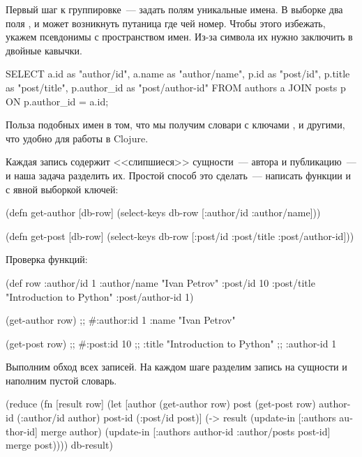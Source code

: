 Первый шаг к группировке~--- задать полям уникальные имена. В выборке два поля , и может возникнуть путаница где чей номер. Чтобы этого избежать, укажем псевдонимы с пространством имен. Из-за символа \code{/} их нужно заключить в двойные кавычки.

\begin{english}
  \begin{sql}
SELECT
  a.id        as "author/id",
  a.name      as "author/name",
  p.id        as "post/id",
  p.title     as "post/title",
  p.author_id as "post/author-id"
FROM authors a
JOIN posts p ON p.author_id = a.id;
  \end{sql}
\end{english}

Польза подобных имен в том, что мы получим словари с ключами ,  и другими, что удобно для работы в Clojure.

Каждая запись содержит <<слипшиеся>> сущности~--- автора и публикацию~--- и наша задача разделить их. Простой способ это сделать~--- написать функции  и  с явной выборкой ключей:

\begin{english}
  \begin{clojure}
(defn get-author [db-row]
  (select-keys db-row [:author/id :author/name]))

(defn get-post [db-row]
  (select-keys db-row
    [:post/id :post/title :post/author-id]))
  \end{clojure}
\end{english}

Проверка функций:

\begin{english}
  \begin{clojure}
(def row
  {:author/id 1
   :author/name "Ivan Petrov"
   :post/id 10
   :post/title "Introduction to Python"
   :post/author-id 1})

(get-author row)
;; #:author{:id 1 :name "Ivan Petrov"}

(get-post row)
;; #:post{:id 10
;;        :title "Introduction to Python"
;;        :author-id 1}
  \end{clojure}
\end{english}

Выполним обход всех записей. На каждом шаге разделим запись на сущности и наполним пустой словарь.

\begin{english}
  \begin{clojure}
(reduce
 (fn [result row]
   (let [author    (get-author row)
         post      (get-post row)
         author-id (:author/id author)
         post-id   (:post/id post)]
     (-> result
         (update-in [:authors author-id]
                    merge author)
         (update-in [:authors author-id
                     :author/posts post-id]
                    merge post))))
 {}
 db-result)
  \end{clojure}
\end{english}


